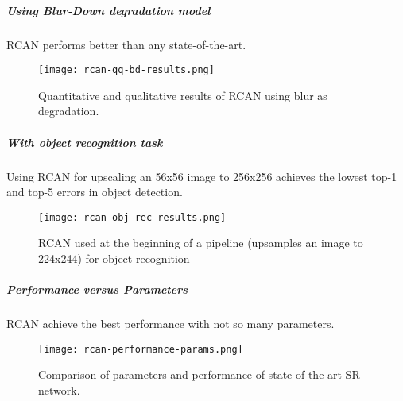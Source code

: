 \subparagraph{Using Blur-Down degradation model}
RCAN performs better than any state-of-the-art.
\begin{figure}[H]
    \centering
    \texttt{[image: rcan-qq-bd-results.png]}
    \caption{Quantitative and qualitative results of RCAN using blur as degradation.}
\end{figure}

\subparagraph{With object recognition task}
Using RCAN for upscaling an 56x56 image to 256x256 achieves the lowest top-1 and top-5 errors in object detection.
\begin{figure}[H]
    \centering
    \texttt{[image: rcan-obj-rec-results.png]}
    \caption{RCAN used at the beginning of a pipeline (upsamples an image to 224x244) for object recognition}
\end{figure}

\subparagraph{Performance versus Parameters}
RCAN achieve the best performance with not so many parameters.
\begin{figure}[H]
    \centering
    \texttt{[image: rcan-performance-params.png]}
    \caption{Comparison of parameters and performance of state-of-the-art SR network.}
\end{figure}